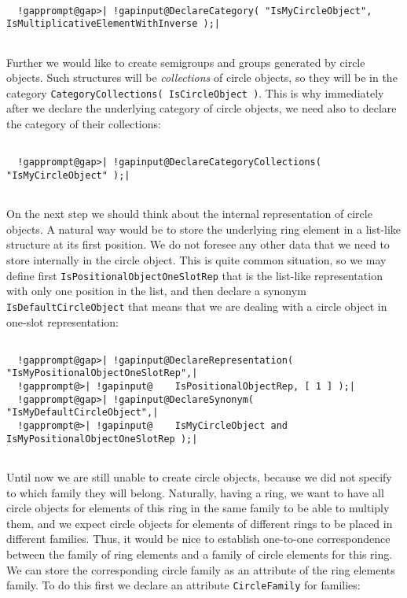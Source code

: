\documentclass[a4paper,11pt]{report}
\begin{document}
{{ 
\begin{Verbatim}[commandchars=!@|,fontsize=\small,frame=single,label=Example]
  
  !gapprompt@gap>| !gapinput@DeclareCategory( "IsMyCircleObject", IsMultiplicativeElementWithInverse );|
  
\end{Verbatim}
 Further we would like to create semigroups and groups generated by circle
objects. Such structures will be \emph{collections} of circle objects, so they will be in the category \texttt{CategoryCollections( IsCircleObject )}. This is why immediately after we declare the underlying category of circle
objects, we need also to declare the category of their collections: 
\begin{Verbatim}[commandchars=!@|,fontsize=\small,frame=single,label=Example]
  
  !gapprompt@gap>| !gapinput@DeclareCategoryCollections( "IsMyCircleObject" );|
  
\end{Verbatim}
 On the next step we should think about the internal representation of circle
objects. A natural way would be to store the underlying ring element in a
list-like structure at its first position. We do not foresee any other data
that we need to store internally in the circle object. This is quite common
situation, so we may define first \texttt{IsPositionalObjectOneSlotRep} that is the list-like representation with only one position in the list, and
then declare a synonym \texttt{IsDefaultCircleObject} that means that we are dealing with a circle object in one-slot
representation: 
\begin{Verbatim}[commandchars=!@|,fontsize=\small,frame=single,label=Example]
  
  !gapprompt@gap>| !gapinput@DeclareRepresentation( "IsMyPositionalObjectOneSlotRep",|
  !gapprompt@>| !gapinput@    IsPositionalObjectRep, [ 1 ] );|
  !gapprompt@gap>| !gapinput@DeclareSynonym( "IsMyDefaultCircleObject",|
  !gapprompt@>| !gapinput@    IsMyCircleObject and IsMyPositionalObjectOneSlotRep );|
  
\end{Verbatim}
 Until now we are still unable to create circle objects, because we did not
specify to which family they will belong. Naturally, having a ring, we want to
have all circle objects for elements of this ring in the same family to be
able to multiply them, and we expect circle objects for elements of different
rings to be placed in different families. Thus, it would be nice to establish
one-to-one correspondence between the family of ring elements and a family of
circle elements for this ring. We can store the corresponding circle family as
an attribute of the ring elements family. To do this first we declare an
attribute \texttt{CircleFamily} for families: 
\begin{Verbatim}[commandchars=!@|,fontsize=\small,frame=single,label=Example]
  

\end{Verbatim}}}
\end{document}
